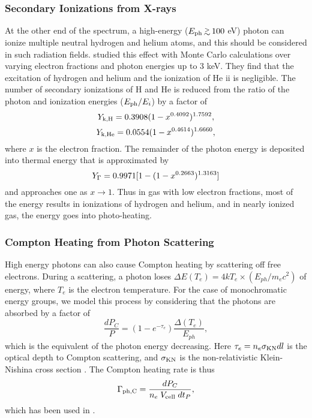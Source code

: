 \documentclass[useAMS,usenatbib,a4paper]{mn2e}
\begin{document}
\subsubsection{Secondary Ionizations from X-rays}
\label{sec:xrays}

At the other end of the spectrum, a high-energy ($E_{\rm ph} \gsim
100$ eV) photon can ionize multiple neutral hydrogen and helium atoms,
and this should be considered in such radiation fields.
\citet{Shull85} studied this effect with Monte Carlo calculations over
varying electron fractions and photon energies up to 3 keV.  They find
that the excitation of hydrogen and helium and the ionization of
He {\sc ii} is negligible.  The number of secondary ionizations of H
and He is reduced from the ratio of the photon and ionization energies
($E_{\rm ph} / E_i$) by a factor of
%
\begin{equation}
  Y_{\rm k,H} = 0.3908 (1 - x^{0.4092})^{1.7592},
\end{equation}
\begin{equation}
  Y_{\rm k,He} = 0.0554 (1 - x^{0.4614})^{1.6660},
\end{equation}
where $x$ is the electron fraction.  The remainder of the photon
energy is deposited into thermal energy that is approximated by
%
\begin{equation}
  Y_{\rm \Gamma} = 0.9971 [ 1 - (1 - x^{0.2663})^{1.3163} ]
\end{equation}
and approaches one as $x \rightarrow 1$.  Thus in gas with low
electron fractions, most of the energy results in ionizations of
hydrogen and helium, and in nearly ionized gas, the energy goes into
photo-heating.

\subsubsection{Compton Heating from Photon Scattering}

High energy photons can also cause Compton heating by scattering off
free electrons.  During a scattering, a photon loses $\Delta E(T_e) =
4kT_e \times (E_{ph} / m_e c^2)$ of energy, where $T_e$ is the
electron temperature.  For the case of monochromatic energy groups, we
model this process by considering that the photons are absorbed by a
factor of 
\begin{equation}
  \frac{dP_C}{P} = (1 - e^{-\tau_e}) \frac{\Delta(T_e)}{E_{ph}},
\end{equation}
which is the equivalent of the photon energy decreasing.  Here $\tau_e
= n_e \sigma_{\rm KN} dl$ is the optical depth to Compton scattering,
and $\sigma_{\rm KN}$ is the non-relativistic Klein-Nishina cross
section \citep{Rybicki}.  The Compton heating rate is thus
\begin{equation}
  \Gamma_{\rm ph,C} = \frac{dP_C}{n_e \; V_{\rm cell} \; dt_P},
\end{equation}
which has been used in \citet{Kim11}.
\end{document}
